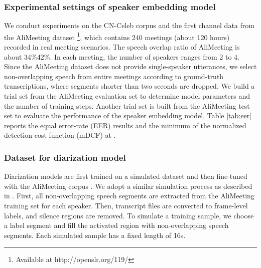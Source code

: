 \documentclass[a4paper]{article}
\begin{document}
\subsubsection{Experimental settings of speaker embedding model}
We conduct experiments on the CN-Celeb \cite{FanKLLCCZZCW20} corpus and the first channel data from the AliMeeting dataset \cite{FanYu2022}\footnote{Available at http://openslr.org/119/}, which contains 240 meetings (about 120 hours) recorded in real meeting scenarios. 
The speech overlap ratio of AliMeeting is about 34\%42\%. In each meeting, the number of speakers ranges from 2 to 4.
Since the AliMeeting dataset does not provide single-speaker utterances, we select non-overlapping speech from entire meetings according to ground-truth transcriptions, where segments shorter than two seconds are dropped.
We build a trial set from the AliMeeting evaluation set to determine model parameters and the number of training steps. 
Another trial set is built from the AliMeeting test set to evaluate the performance of the speaker embedding model. Table \ref{tab:eer} reports the equal error-rate (EER) results and the minimum of the normalized detection cost function (mDCF) at .

\linespread{1.1}
\begin{table}[t!]
	\caption{The performance of speaker embedding model.}
	\label{tab:eer}
	\centering
	\vspace{-0.4cm}
\end{table}
\subsubsection{Dataset for diarization model}
Diarization models are first trained on a simulated dataset and then fine-tuned with the AliMeeting corpus \cite{FanYu2022}.
We adopt a similar simulation process as described in \cite{Weiqing2022}. First, all non-overlapping speech segments are extracted from the AliMeeting training set for each speaker.
Then, transcript files are converted to frame-level labels, and silence regions are removed.
To simulate a training sample, we choose a label segment and fill the activated region with non-overlapping speech segments. Each simulated sample has a fixed length of 16s.
\end{document}
